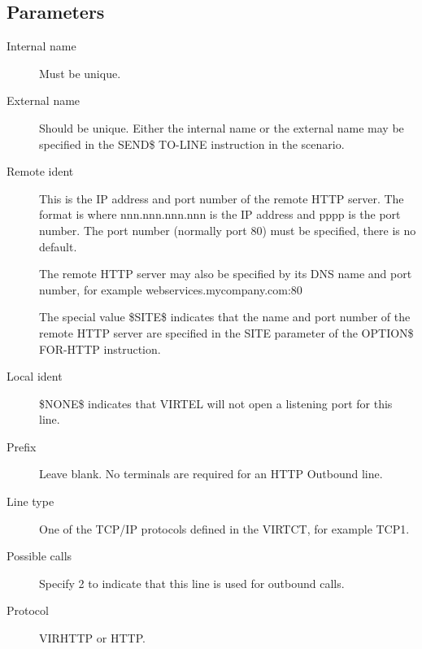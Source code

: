 \documentclass[letterpaper,10pt,english]{sphinxmanual}
\begin{document}
\subsection{Parameters}
\label{\detokenize{connectivity_guide:index-16}}\label{\detokenize{connectivity_guide:id2}}\begin{description}
\item[{Internal name}] \leavevmode
Must be unique.

\item[{External name}] \leavevmode
Should be unique. Either the internal name or the external name may be specified in the SEND\$ TO-LINE instruction in the scenario.

\item[{Remote ident}] \leavevmode
This is the IP address and port number of the remote HTTP server. The format is  where nnn.nnn.nnn.nnn is the
IP address and pppp is the port number. The port number (normally port 80) must be specified, there is no default.

The remote HTTP server may also be specified by its DNS name and port number, for example webservices.mycompany.com:80

The special value \$SITE\$ indicates that the name and port number of the remote HTTP server are specified in the SITE parameter of the OPTION\$ FOR-HTTP instruction.

\item[{Local ident}] \leavevmode
\$NONE\$ indicates that VIRTEL will not open a listening port for this line.

\item[{Prefix}] \leavevmode
Leave blank. No terminals are required for an HTTP Outbound line.

\item[{Line type}] \leavevmode
One of the TCP/IP protocols defined in the VIRTCT, for example TCP1.

\item[{Possible calls}] \leavevmode
Specify 2 to indicate that this line is used for outbound calls.

\item[{Protocol}] \leavevmode
VIRHTTP or HTTP.

\end{description}

\ignorespaces 
\end{document}
